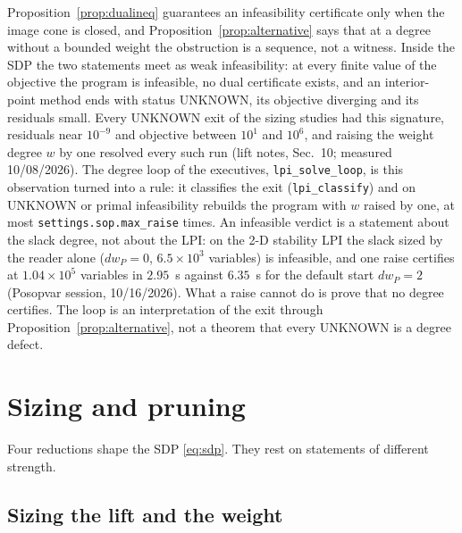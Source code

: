 \documentclass[12pt]{article}
\newcommand{\code}[1]{\texttt{#1}}
\theoremstyle{plain}
\theoremstyle{definition}
\theoremstyle{remark}
\begin{document}
Proposition~\ref{prop:dualineq} guarantees an infeasibility certificate only when the image cone is closed, and Proposition~\ref{prop:alternative} says that at a degree without a bounded weight the obstruction is a sequence, not a witness. Inside the SDP the two statements meet as weak infeasibility: at every finite value of the objective the program is infeasible, no dual certificate exists, and an interior-point method ends with status UNKNOWN, its objective diverging and its residuals small. Every UNKNOWN exit of the sizing studies had this signature, residuals near $10^{-9}$ and objective between $10^{1}$ and $10^{6}$, and raising the weight degree $w$ by one resolved every such run (lift notes, Sec.~10; measured 10/08/2026). The degree loop of the executives, \code{lpi\_solve\_loop}, is this observation turned into a rule: it classifies the exit (\code{lpi\_classify}) and on UNKNOWN or primal infeasibility rebuilds the program with $w$ raised by one, at most \code{settings.sop.max\_raise} times. An infeasible verdict is a statement about the slack degree, not about the LPI: on the 2-D stability LPI the slack sized by the reader alone ($dw_P=0$, $6.5\times10^3$ variables) is infeasible, and one raise certifies at $1.04\times10^5$ variables in $2.95$~s against $6.35$~s for the default start $dw_P=2$ (Posopvar session, 10/16/2026). What a raise cannot do is prove that no degree certifies. The loop is an interpretation of the exit through Proposition~\ref{prop:alternative}, not a theorem that every UNKNOWN is a degree defect.

\section{Sizing and pruning}\label{sec:pruning}

Four reductions shape the SDP \eqref{eq:sdp}. They rest on statements of different strength.

\subsection{Sizing the lift and the weight}\label{sec:sizing}
\end{document}
